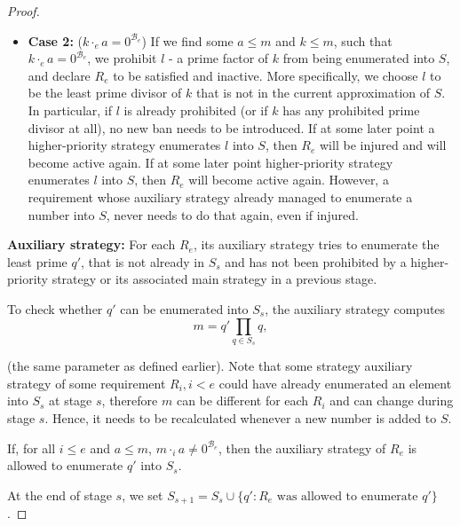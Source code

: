 \documentclass{pracalicmgr2025}
\theoremstyle{plain}            %
\theoremstyle{remark}           %
\theoremstyle{definition}       %
\begin{document}
\begin{proof}
\begin{itemize}
    \item \textbf{Case 2:} ($k \cdot_e a = 0^{\mathcal{B}_e}$)  
    If we find some $a \le m$ and $k \le m$, such that $k \cdot_e a = 0^{\mathcal{B}_e}$,  
    we prohibit $l$ - a prime factor of $k$ from being enumerated into $S$,  
    and declare $R_e$ to be satisfied and inactive. More specifically, we choose $l$ to be the least prime divisor of $k$ that is not in the current approximation of $S$. In particular, if $l$ is already prohibited (or if $k$ has any prohibited prime divisor at all), no new ban needs to be introduced. If at some later point a higher-priority strategy enumerates $l$ into $S$, then $R_e$ will be injured and will become active again. If at some later point higher-priority strategy enumerates $l$ into $S$, then $R_e$ will become active again. However, a requirement whose auxiliary strategy already managed to enumerate a number into $S$, never needs to do that again, even if injured. 
\end{itemize}

\textbf{Auxiliary strategy:}  
For each $R_e$, its auxiliary strategy tries to enumerate the least prime $q'$, that is not already in $S_s$ and has not been prohibited by a higher-priority strategy or its associated main strategy in a previous stage.

To check whether $q'$ can be enumerated into $S_s$, the auxiliary strategy computes
$$m = q' \prod_{q \in S_s} q,$$


 (the same parameter as defined earlier). Note that some strategy auxiliary strategy of some requirement $R_i, i<e$ could have already enumerated an element into $S_s$ at stage $s$, therefore $m$ can be different for each $R_i$ and can change during stage $s$. Hence, it needs to be recalculated whenever a new number is added to $S$.

If, for all $i \le e$ and $a \le m$, $m \cdot_i a \neq 0^{\mathcal{B}_e}$, then the auxiliary strategy of $R_e$ is allowed to enumerate $q'$ into $S_s$.

At the end of stage $s$, we set $S_{s+1} = S_s\cup {\{q':R_e \text{ was allowed to enumerate $q'$}\}}$. 


\end{proof}
\end{document}
